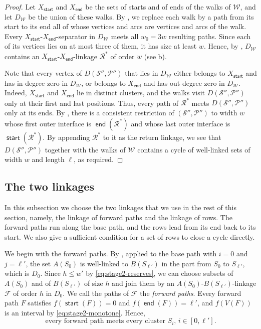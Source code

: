 \documentclass[fontsize=12pt,leading=14pt]{fullpaper}
\DeclareMathOperator{\st}{\mathsf{start}}
\DeclareMathOperator{\en}{\mathsf{end}}
\newcommand{\Fcal}{\mathcal{F}}
\newcommand{\Pcal}{\mathcal{P}}
\newcommand{\Rcal}{\mathcal{R}}
\newcommand{\Scal}{\mathcal{S}}
\newcommand{\Wcal}{\mathcal{W}}
\begin{document}
\begin{proof}
  Let $X_{\st}$ and $X_{\en}$ be the sets of starts and of ends of the walks of $\Wcal$, and let $D_\Wcal$ be the union of these walks.
  By , we replace each walk by a path from its start to its end all of whose vertices and arcs are vertices and arcs of the walk.
  Every $X_{\st}$-$X_{\en}$-separator in $D_\Wcal$ meets all $w_0=3w$ resulting paths.
  Since each of its vertices lies on at most three of them, it has size at least $w$.
  Hence, by , $D_\Wcal$ contains an $X_{\st}$-$X_{\en}$-linkage $\Rcal^*$ of order $w$ (see b).

  Note that every vertex of $D(\Scal'',\Pcal'')$ that lies in $D_\Wcal$ either belongs to $X_{\st}$ and has in-degree zero in $D_\Wcal$, or belongs to $X_{\en}$ and has out-degree zero in $D_\Wcal$.
  Indeed, $X_{\st}$ and $X_{\en}$ lie in distinct clusters, and the walks visit $D(\Scal'',\Pcal'')$ only at their first and last positions.
  Thus, every path of $\Rcal^*$ meets $D(\Scal'',\Pcal'')$ only at its ends.
  By , there is a consistent restriction of $(\Scal'',\Pcal'')$ to width $w$ whose first outer interface is $\en(\Rcal^*)$ and whose last outer interface is $\st(\Rcal^*)$.
  By appending $\Rcal^*$ to it as the return linkage, we see that $D(\Scal'',\Pcal'')$ together with the walks of $\Wcal$ contains a cycle of well-linked sets of width $w$ and length $\ell$, as required.
\end{proof}

\subsection{The two linkages}\label{sec:stage2-linkages}

In this subsection we choose the two linkages that we use in the rest of this section, namely, the linkage of forward paths and the linkage of rows.
The forward paths run along the base path, and the rows lead from its end back to its start.
We also give a sufficient condition for a set of rows to close a cycle directly.

We begin with the forward paths.
By , applied to the base path with $i=0$ and $j=\ell'$, the set $A(S_0)$ is well-linked to $B(S_{\ell'})$ in the part from $S_0$ to $S_{\ell'}$, which is $D_0$.
Since $h\le w'$ by \eqref{eq:stage2-reserves}, we can choose subsets of $A(S_0)$ and of $B(S_{\ell'})$ of size $h$ and join them by an $A(S_0)$-$B(S_{\ell'})$-linkage $\Fcal$ of order $h$ in $D_0$.
We call the paths of $\Fcal$ the \emph{forward paths}.
Every forward path $F$ satisfies $f(\st(F))=0$ and $f(\en(F))=\ell'$, and $f(V(F))$ is an interval by \eqref{eq:stage2-monotone}.
Hence,
\begin{equation}\label{eq:stage2-forward}
  \text{every forward path meets every cluster $S_i$, $i\in[0,\ell']$.}
\end{equation}
\end{document}
